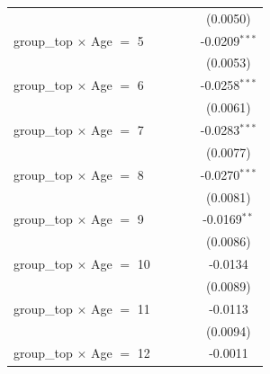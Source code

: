 \begin{table}[htbp]
\begin{tabular}{lcccc}
                                       &                       &                       &                       & (0.0050)\\   
      group\_top $\times$ Age $=$ 5    &                       &                       &                       & -0.0209$^{***}$\\   
                                       &                       &                       &                       & (0.0053)\\   
      group\_top $\times$ Age $=$ 6    &                       &                       &                       & -0.0258$^{***}$\\   
                                       &                       &                       &                       & (0.0061)\\   
      group\_top $\times$ Age $=$ 7    &                       &                       &                       & -0.0283$^{***}$\\   
                                       &                       &                       &                       & (0.0077)\\   
      group\_top $\times$ Age $=$ 8    &                       &                       &                       & -0.0270$^{***}$\\   
                                       &                       &                       &                       & (0.0081)\\   
      group\_top $\times$ Age $=$ 9    &                       &                       &                       & -0.0169$^{**}$\\   
                                       &                       &                       &                       & (0.0086)\\   
      group\_top $\times$ Age $=$ 10   &                       &                       &                       & -0.0134\\   
                                       &                       &                       &                       & (0.0089)\\   
      group\_top $\times$ Age $=$ 11   &                       &                       &                       & -0.0113\\   
                                       &                       &                       &                       & (0.0094)\\   
      group\_top $\times$ Age $=$ 12   &                       &                       &                       & -0.0011\\   

\end{tabular}
\end{table}
